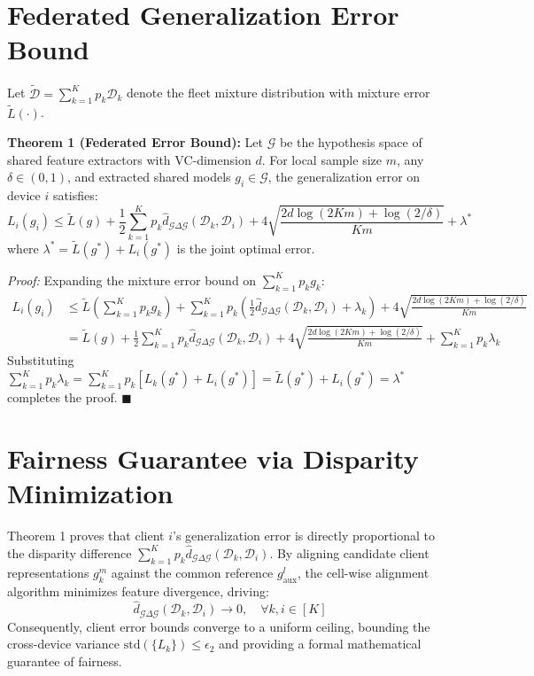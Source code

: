 \documentclass[12pt,a4paper]{report}
\begin{document}
\section{Federated Generalization Error Bound}
Let $\tilde{\mathcal{D}} = \sum_{k=1}^K p_k \mathcal{D}_k$ denote the fleet mixture distribution with mixture error $\tilde{L}(\cdot)$.

\noindent \textbf{Theorem 1 (Federated Error Bound):} Let $\mathcal{G}$ be the hypothesis space of shared feature extractors with VC-dimension $d$. For local sample size $m$, any $\delta \in (0,1)$, and extracted shared models $g_i \in \mathcal{G}$, the generalization error on device $i$ satisfies:
\begin{equation}
    L_i(g_i) \le \tilde{L}(g) + \frac{1}{2} \sum_{k=1}^K p_k \hat{d}_{\mathcal{G}\Delta\mathcal{G}}(\mathcal{D}_k, \mathcal{D}_i) + 4\sqrt{\frac{2d\log(2Km) + \log(2/\delta)}{Km}} + \lambda^*
\end{equation}
where $\lambda^* = \tilde{L}(g^*) + L_i(g^*)$ is the joint optimal error.

\noindent \textit{Proof:} Expanding the mixture error bound on $\sum_{k=1}^K p_k g_k$:
\begin{align}
    L_i(g_i) &\le \tilde{L}\left(\sum_{k=1}^K p_k g_k\right) + \sum_{k=1}^K p_k \left( \frac{1}{2}\hat{d}_{\mathcal{G}\Delta\mathcal{G}}(\mathcal{D}_k, \mathcal{D}_i) + \lambda_k \right) + 4\sqrt{\frac{2d\log(2Km) + \log(2/\delta)}{Km}} \nonumber \\
    &= \tilde{L}(g) + \frac{1}{2}\sum_{k=1}^K p_k \hat{d}_{\mathcal{G}\Delta\mathcal{G}}(\mathcal{D}_k, \mathcal{D}_i) + 4\sqrt{\frac{2d\log(2Km) + \log(2/\delta)}{Km}} + \sum_{k=1}^K p_k \lambda_k
\end{align}
Substituting $\sum_{k=1}^K p_k \lambda_k = \sum_{k=1}^K p_k [L_k(g^*) + L_i(g^*)] = \tilde{L}(g^*) + L_i(g^*) = \lambda^*$ completes the proof. $\blacksquare$

\section{Fairness Guarantee via Disparity Minimization}
Theorem 1 proves that client $i$'s generalization error is directly proportional to the disparity difference $\sum_{k=1}^K p_k \hat{d}_{\mathcal{G}\Delta\mathcal{G}}(\mathcal{D}_k, \mathcal{D}_i)$. By aligning candidate client representations $g_k^m$ against the common reference $g_{\text{aux}}^l$, the cell-wise alignment algorithm minimizes feature divergence, driving:
\begin{equation}
    \hat{d}_{\mathcal{G}\Delta\mathcal{G}}(\mathcal{D}_k, \mathcal{D}_i) \to 0, \quad \forall k, i \in [K]
\end{equation}
Consequently, client error bounds converge to a uniform ceiling, bounding the cross-device variance $\mathrm{std}(\{L_k\}) \le \epsilon_2$ and providing a formal mathematical guarantee of fairness.
\end{document}
